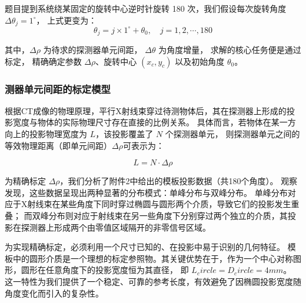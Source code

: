 题目提到系统绕某固定的旋转中心逆时针旋转 180 次，我们假设每次旋转角度 $\Delta\theta_j = 1^\circ$，
上式更变为：
\begin{equation*}
    \theta_j = j \times 1^\circ + \theta_0, \quad j=1,2,\cdots,180
\end{equation*}

其中，$\Delta\rho$ 为待求的探测器单元间距，
$\Delta\theta$ 为角度增量，
求解的核心任务便是通过标定，
精确确定参数 $\Delta\rho$、旋转中心 $(x_c, y_c)$ 以及初始角度 $\theta_0$。




\subsubsection{测器单元间距的标定模型}

根据CT成像的物理原理，平行X射线束穿过待测物体后，其在探测器上形成的投影宽度与物体的实际物理尺寸存在直接的比例关系。
具体而言，若物体在某一方向上的投影物理宽度为 $L$，该投影覆盖了 $N$ 个探测器单元，
则探测器单元之间的等效物理距离（即单元间距）$\Delta\rho$可表示为：

$$L = N \cdot \Delta\rho$$

为精确标定 $\Delta\rho$，我们分析了附件2中给出的模板投影数据（共180个角度）。
观察发现，这些数据呈现出两种显著的分布模式：单峰分布与双峰分布。
单峰分布对应于X射线束在某些角度下同时穿过椭圆与圆形两个介质，导致它们的投影发生重叠；
而双峰分布则对应于射线束在另一些角度下分别穿过两个独立的介质，其投影在探测器上形成两个由零值区域隔开的非零信号区域。
\par


为实现精确标定，必须利用一个尺寸已知的、在投影中易于识别的几何特征。
模板中的圆形介质是一个理想的标定参照物。其关键优势在于，作为一个中心对称图形，圆形在任意角度下的投影宽度恒为其直径，
即 $L_circle = D_circle = 4 mm$。
这一特性为我们提供了一个稳定、可靠的参考长度，有效避免了因椭圆投影宽度随角度变化而引入的复杂性。\par



